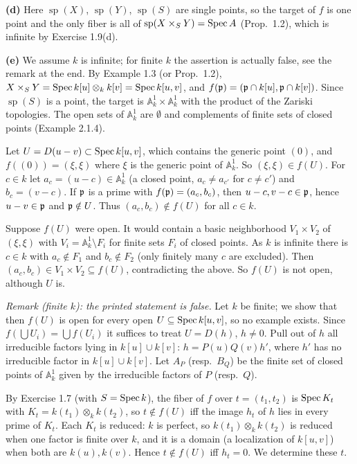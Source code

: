 \documentclass[11pt]{article}
\begin{document}
\textbf{(d)} Here $\operatorname{sp}(X)$, $\operatorname{sp}(Y)$, $\operatorname{sp}(S)$ are single points, so the target of $f$ is one point and the only fiber is all of $\operatorname{sp}(X\times_SY)=\operatorname{Spec} A$ (Prop.~1.2), which is infinite by Exercise 1.9(d).

\textbf{(e)} We assume $k$ is infinite; for finite $k$ the assertion is actually false, see the remark at the end. By Example 1.3 (or Prop.~1.2), $X\times_SY=\operatorname{Spec} k[u]\otimes_kk[v]=\operatorname{Spec} k[u,v]$, and $f(\mathfrak p)=(\mathfrak p\cap k[u],\mathfrak p\cap k[v])$. Since $\operatorname{sp}(S)$ is a point, the target is $\mathbb A^1_k\times\mathbb A^1_k$ with the product of the Zariski topologies. The open sets of $\mathbb A^1_k$ are $\emptyset$ and complements of finite sets of closed points (Example 2.1.4).

Let $U=D(u-v)\subset\operatorname{Spec} k[u,v]$, which contains the generic point $(0)$, and $f((0))=(\xi,\xi)$ where $\xi$ is the generic point of $\mathbb A^1_k$. So $(\xi,\xi)\in f(U)$. For $c\in k$ let $a_c=(u-c)\in\mathbb A^1_k$ (a closed point, $a_c\ne a_{c'}$ for $c\neq c'$) and $b_c=(v-c)$. If $\mathfrak p$ is a prime with $f(\mathfrak p)=(a_c,b_c)$, then $u-c,v-c\in\mathfrak p$, hence $u-v\in\mathfrak p$ and $\mathfrak p\notin U$. Thus $(a_c,b_c)\notin f(U)$ for all $c\in k$.

Suppose $f(U)$ were open. It would contain a basic neighborhood $V_1\times V_2$ of $(\xi,\xi)$ with $V_i=\mathbb A^1_k\setminus F_i$ for finite sets $F_i$ of closed points. As $k$ is infinite there is $c\in k$ with $a_c\notin F_1$ and $b_c\notin F_2$ (only finitely many $c$ are excluded). Then $(a_c,b_c)\in V_1\times V_2\subseteq f(U)$, contradicting the above. So $f(U)$ is not open, although $U$ is.

\emph{Remark (finite $k$): the printed statement is false.} Let $k$ be finite; we show that then $f(U)$ is open for every open $U\subseteq\operatorname{Spec} k[u,v]$, so no example exists. Since $f(\bigcup U_i)=\bigcup f(U_i)$ it suffices to treat $U=D(h)$, $h\neq0$. Pull out of $h$ all irreducible factors lying in $k[u]\cup k[v]$: $h=P(u)Q(v)h'$, where $h'$ has no irreducible factor in $k[u]\cup k[v]$. Let $A_P$ (resp.\ $B_Q$) be the finite set of closed points of $\mathbb A^1_k$ given by the irreducible factors of $P$ (resp.\ $Q$).

By Exercise 1.7 (with $S=\operatorname{Spec} k$), the fiber of $f$ over $t=(t_1,t_2)$ is $\operatorname{Spec} K_t$ with $K_t=k(t_1)\otimes_kk(t_2)$, so $t\notin f(U)$ iff the image $h_t$ of $h$ lies in every prime of $K_t$. Each $K_t$ is reduced: $k$ is perfect, so $k(t_1)\otimes_k k(t_2)$ is reduced when one factor is finite over $k$, and it is a domain (a localization of $k[u,v]$) when both are $k(u),k(v)$. Hence $t\notin f(U)$ iff $h_t=0$. We determine these $t$.
\end{document}
